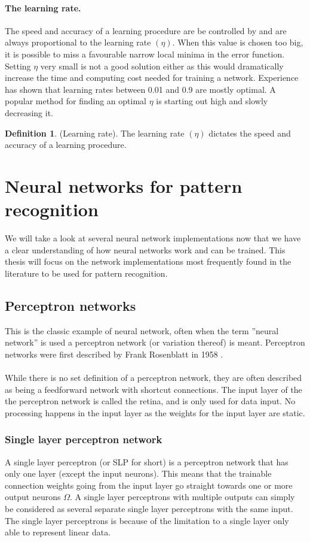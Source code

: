 \documentclass[pdftex,a4paper,12pt,twoside]{report}
\theoremstyle{plain} \newtheorem{theorem}{Theorem} \newtheorem{proposition}{Proposition} \newtheorem{lemma}{Lemma} \newtheorem*{corollary}{Corollary}
\theoremstyle{definition} \newtheorem{definition}{Definition} \newtheorem{conjecture}{Conjecture} \newtheorem*{example}{Example} \newtheorem{algorithm}{Algorithm}
\theoremstyle{remark} \newtheorem*{remark}{Remark} \newtheorem*{note}{Note} \newtheorem{case}{Case}
\begin{document}
\paragraph{The learning rate.}
The speed and accuracy of a learning procedure are be controlled by and are always proportional to the learning rate $(\eta)$. When this value is chosen too big, it is possible to miss a favourable narrow local minima in the error function. Setting $\eta$ very small is not a good solution either as this would dramatically increase the time and computing cost needed for training a network. Experience has shown that learning rates between 0.01 and 0.9 are mostly optimal. A popular method for finding an optimal $\eta$ is starting out high and slowly decreasing it.
\begin{definition}
(Learning rate). The learning rate $(\eta)$ dictates the speed and accuracy of a learning procedure.
\end{definition}
\section{Neural networks for pattern recognition}
We will take a look at several neural network implementations now that we have a clear understanding of how neural networks work and can be trained. This thesis will focus on the network implementations most frequently found in the literature to be used for pattern recognition.
\subsection{Perceptron networks}
This is the classic example of neural network, often when the term ''neural network'' is used a perceptron network (or variation thereof) is meant. Perceptron networks were first described by Frank Rosenblatt in 1958 \citep{Rosenblat1958}. \\\\While there is no set definition of a perceptron network, they are often described as being a feedforward network with shortcut connections. The input layer of the the perceptron network is called the retina, and is only used for data input. No processing happens in the input layer as the weights for the input layer are static.
\subsubsection{Single layer perceptron network}
A single layer perceptron (or SLP for short) is a perceptron network that has only one layer (except the input neurons). This means that the trainable connection weights going from the input layer go straight towards one or more output neurons $\Omega$. A single layer perceptrons with multiple outputs can simply be considered as several separate single layer perceptrons with the same input. The single layer perceptrons is because of the limitation to a single layer only able to represent linear data.
\end{document}
